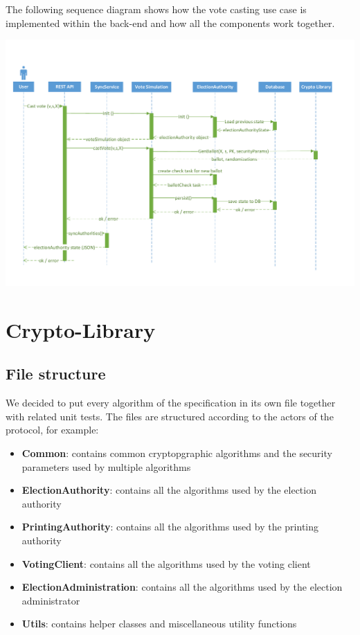 The following sequence diagram shows how the vote casting use case is implemented within the back-end and how all the components work together.

\begin{center}
\includegraphics[scale=0.62]{assets/votecastingDiagram.pdf}
\label{Vote casting sequence diagram}%
\end{center}

\section{Crypto-Library}

\subsection{File structure}
We decided to put every algorithm of the specification in its own file together with related unit tests. The files are structured according to the actors of the protocol, for example:

\begin{itemize}
	\item \textbf{Common}: contains common cryptopgraphic algorithms and the security parameters used by multiple algorithms
	\item \textbf{ElectionAuthority}: contains all the algorithms used by the election authority
	\item \textbf{PrintingAuthority}: contains all the algorithms used by the printing authority
	\item \textbf{VotingClient}: contains all the algorithms used by the voting client
	\item \textbf{ElectionAdministration}: contains all the algorithms used by the election administrator
	\item \textbf{Utils}: contains helper classes and miscellaneous utility functions
\end{itemize}

